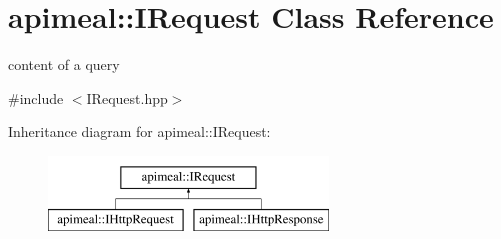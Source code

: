 \hypertarget{classapimeal_1_1IRequest}{\section{apimeal\-:\-:I\-Request Class Reference}
\label{classapimeal_1_1IRequest}
}


content of a query  




{\ttfamily \#include $<$I\-Request.\-hpp$>$}

Inheritance diagram for apimeal\-:\-:I\-Request\-:\begin{figure}[H]
\begin{center}
\leavevmode
\includegraphics[height=2.000000cm]{classapimeal_1_1IRequest}
\end{center}
\end{figure}
